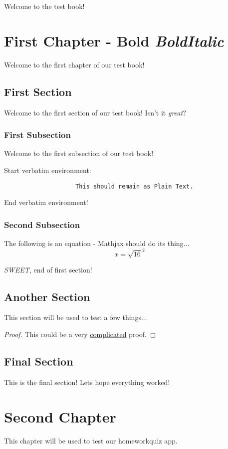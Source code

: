 \documentclass{camel}
\begin{document}
	Welcome to the test book!

	\chapter{First Chapter - \textbf{Bold \textit{BoldItalic}}}
		Welcome to the first chapter of our test book!

		\section{First Section}
			Welcome to the first section of our test book!
			Isn't it \emph{great}?

			\subsection{First Subsection}
				Welcome to the first subsection of our test book!

				Start verbatim environment:
				\begin{verbatim}
					This should remain as Plain Text.
				\end{verbatim}
				End verbatim environment!

			\subsection{Second Subsection}
				The following is an equation - Mathjax should do its thing...
				\begin{equation}
					x = \sqrt{16}^2
				\end{equation}

			\textit{SWEET}, end of first section!

		\section{Another Section}
			This section will be used to test a few things...
			\begin{proof}
				This could be a very \underline{complicated} proof.
			\end{proof}

		\section{Final Section}
			This is the final section!
			Lets hope everything worked!

	\chapter{Second Chapter}
		This chapter will be used to test our homeworkquiz app.
\end{document}
